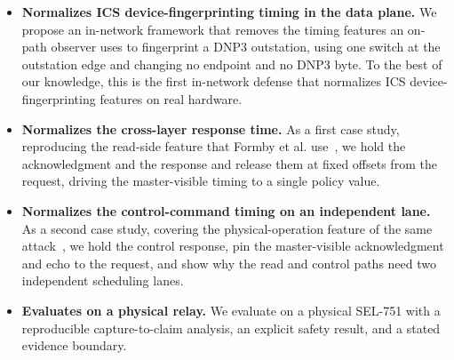 \begin{itemize}
  \item \textbf{Normalizes ICS device-fingerprinting timing in the data plane.} We propose an
    in-network framework that removes the timing features an on-path observer uses to fingerprint a
    DNP3 outstation, using one switch at the outstation edge and changing no endpoint and no DNP3
    byte. To the best of our knowledge, this is the first in-network defense that normalizes ICS
    device-fingerprinting features on real hardware.
  \item \textbf{Normalizes the cross-layer response time.} As a first case study, reproducing the
    read-side feature that Formby et al. use~\cite{formbyWhosControlYour2016}, we hold the acknowledgment and the
    response and release them at fixed offsets from the request, driving the master-visible timing to
    a single policy value.
  \item \textbf{Normalizes the control-command timing on an independent lane.} As a second case study,
    covering the physical-operation feature of the same attack~\cite{formbyWhosControlYour2016}, we hold the control
    response, pin the master-visible acknowledgment and echo to the request, and show why the read and
    control paths need two independent scheduling lanes.
  \item \textbf{Evaluates on a physical relay.} We evaluate \sysname on a physical SEL-751 with a
    reproducible capture-to-claim analysis, an explicit safety result, and a stated evidence boundary.
\end{itemize}
